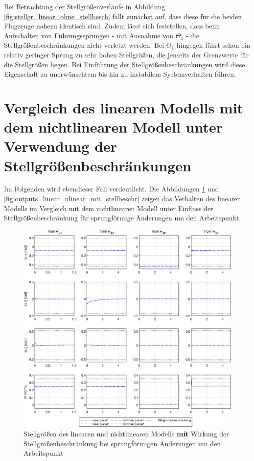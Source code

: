 Bei Betrachtung der Stellgrößenverläufe in Abbildung \ref{fig:stellgr_linear_ohne_stellbesch} fällt zunächst auf, dass diese für die beiden Flugzeuge nahezu identisch sind. Zudem lässt sich feststellen, dass beim Aufschalten von Führungssprüngen - mit Ausnahme von $\Theta_1$ - die Stellgrößenbeschränkungen nicht verletzt werden. Bei $\Theta_1$ hingegen führt schon ein relativ geringer Sprung zu sehr hohen Stellgrößen, die jenseits der Grenzwerte für die Stellgrößen liegen. Bei Einführung der Stellgrößenbeschränkungen wird diese Eigenschaft zu unerwünschtem bis hin zu instabilem Systemverhalten führen. 

\section{Vergleich des linearen Modells mit dem nichtlinearen Modell unter Verwendung der Stellgrößenbeschränkungen}
Im Folgenden wird ebendieser Fall verdeutlicht. Die Abbildungen \ref{fig:stellgr_linear_nlinear_mit_stellbeschr} und \ref{fig:outputs_linear_nlinear_mit_stellbeschr} zeigen das Verhalten des linearen Modells im Vergleich mit dem nichtlinearen Modell unter Einfluss der Stellgrößenbeschränkung für sprungförmige Änderungen um den Arbeitspunkt. 
\begin{figure}[H] %
	\centering
	\includegraphics[scale=0.75]{./Bilder/stellgr_linear_nlinear_mit_stellbeschr_plot_stellgr.eps}
	\caption{Stellgrößen des linearen und nichtlinearen Modells \textbf{mit} Wirkung der Stellgrößenbeschränkung bei sprungförmigen Änderungen um den Arbeitspunkt}
	\label{fig:stellgr_linear_nlinear_mit_stellbeschr}
\end{figure}
